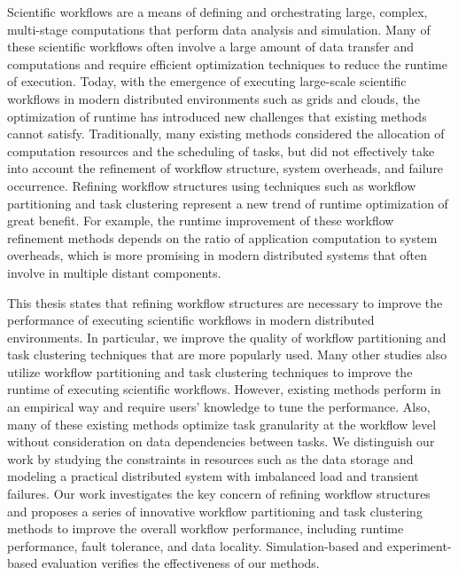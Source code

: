 Scientific workflows are a means of defining and orchestrating large, complex, multi-stage computations that perform data analysis and simulation. 
Many of these scientific workflows often involve a large amount of data transfer and computations and require efficient optimization techniques to reduce the runtime of execution. 
Today, with the emergence of executing large-scale scientific workflows in modern distributed environments such as grids and clouds, the optimization of runtime has introduced new challenges that existing methods cannot satisfy. Traditionally, many existing methods considered the allocation of computation resources and the scheduling of tasks, but did not effectively take into account the refinement of workflow structure, system overheads, and failure occurrence. Refining workflow structures using techniques such as workflow partitioning and task clustering represent a new trend of runtime optimization of great benefit. 
For example, the runtime improvement of these workflow refinement methods depends on the ratio of application computation to system overheads, which is more promising in modern distributed systems that often involve in multiple distant components. 

This thesis states that refining workflow structures are necessary to improve the performance of executing scientific workflows in modern distributed environments. In particular, we improve the quality of workflow partitioning and task clustering techniques that are more popularly used. Many other studies also utilize workflow partitioning and task clustering techniques to improve the runtime of executing scientific workflows. However, existing methods perform in an empirical way and require users' knowledge to tune the performance. Also, many of these existing methods optimize task granularity at the workflow level without consideration on data dependencies between tasks. 
We distinguish our work by studying the constraints in resources such as the data storage and modeling a practical distributed system with imbalanced load and transient failures. 
Our work investigates the key concern of refining workflow structures and proposes a series of innovative workflow partitioning and task clustering methods to improve the overall workflow performance, including runtime performance, fault tolerance, and data locality. Simulation-based and experiment-based evaluation verifies the effectiveness of our methods. 


